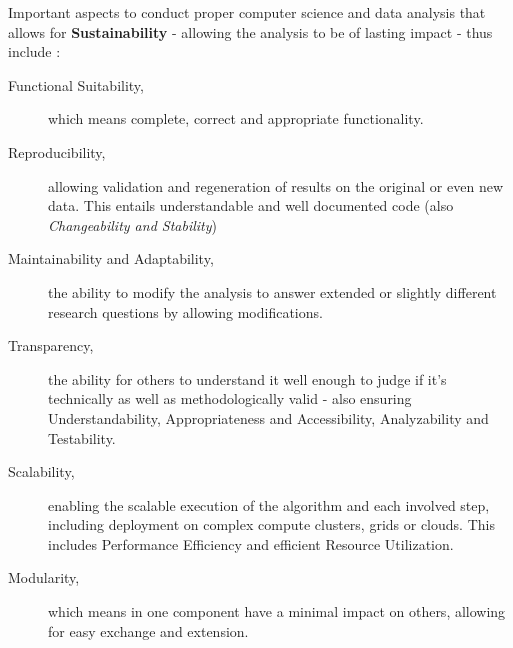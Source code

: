Important aspects to conduct proper computer science and data analysis that allows for \textbf{Sustainability} - allowing the analysis to be of lasting impact - thus include \cite{Molder2021a, 2013ISOI}:

\begin{description}
    \item[Functional Suitability,] which means complete, correct and appropriate functionality.
	\item[Reproducibility,] \ie allowing validation and regeneration of results on the original or even new data. This entails understandable and well documented code (also \textit{Changeability and Stability})
	\item[Maintainability and Adaptability,] \ie the ability to modify the analysis to answer extended or slightly different research questions by allowing modifications.
	\item[Transparency,] \ie the ability for others to understand it well enough to judge if it's technically as well as methodologically valid - also ensuring Understandability, Appropriateness and Accessibility, Analyzability and Testability.
	\item[Scalability,] \ie enabling the scalable execution of the algorithm and each involved step, including deployment on complex compute clusters, grids or clouds. This includes Performance Efficiency and efficient Resource Utilization.
	\item[Modularity,] which means in one component have a minimal impact on others, allowing for easy exchange and extension.
\end{description}


